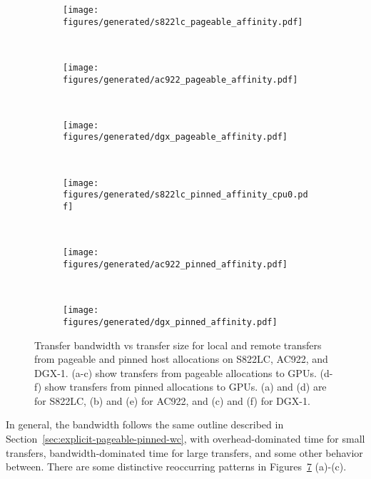 \begin{figure}[ht]
	\centering
	\begin{subfigure}[b]{0.31\textwidth}
		\texttt{[image: figures/generated/s822lc\_pageable\_affinity.pdf]}
		\caption{}
		\label{fig:minsky_pageable_affinity}
	\end{subfigure}
	~
	\begin{subfigure}[b]{0.31\textwidth}
		\texttt{[image: figures/generated/ac922\_pageable\_affinity.pdf]}
		\caption{}
		\label{fig:hal_pageable_affinity}
	\end{subfigure}
	~
	\begin{subfigure}[b]{0.31\textwidth}
		\texttt{[image: figures/generated/dgx\_pageable\_affinity.pdf]}
		\caption{}
		\label{fig:dgx_pageable_affinity}
	\end{subfigure}
	\\
	\begin{subfigure}[b]{0.31\textwidth}
		\texttt{[image: figures/generated/s822lc\_pinned\_affinity\_cpu0.pdf]}
		\caption{}
		\label{fig:minsky_pinned_affinity}
	\end{subfigure}
	~
	\begin{subfigure}[b]{0.31\textwidth}
		\texttt{[image: figures/generated/ac922\_pinned\_affinity.pdf]}
		\caption{}
		\label{fig:hal_pinned_affinity}
	\end{subfigure}
	~
	\begin{subfigure}[b]{0.31\textwidth}
		\texttt{[image: figures/generated/dgx\_pinned\_affinity.pdf]}
		\caption{}
		\label{fig:dgx_pinned_affinity}
		
	\end{subfigure}
	\caption[CPU-GPU affinity and \texttt{cudaMemcpy} bandwidth]{
		Transfer bandwidth vs transfer size for local and remote transfers from pageable and pinned host allocations on S822LC, AC922, and DGX-1.
		(a-c) show transfers from pageable allocations to GPUs.
		(d-f) show transfers from pinned allocations to GPUs.
		(a) and (d) are for S822LC, (b) and (e) for AC922, and (c) and (f) for DGX-1.
	}
	\label{fig:cpu-gpu-affinity-direction}
\end{figure}

In general, the bandwidth follows the same outline described in Section~\ref{sec:explicit-pageable-pinned-wc}, with overhead-dominated time for small transfers, bandwidth-dominated time for large transfers, and some other behavior between.
There are some distinctive reoccurring patterns in Figures~\ref{fig:cpu-gpu-affinity-direction} (a)-(c).

